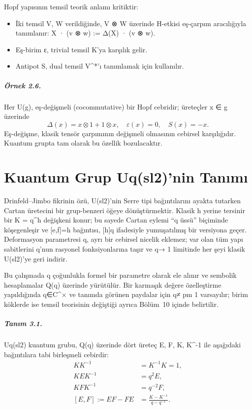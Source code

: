 \documentclass[12pt,a4paper]{report}
\numberwithin{equation}{chapter}
\theoremstyle{plain}
\theoremstyle{definition}
\begin{document}
Hopf yapısının temsil teorik anlamı kritiktir:
\begin{itemize}[leftmargin=*]
  \item İki temsil V, W verildiğinde, V ⊗ W üzerinde H-etkisi
        eş-çarpım aracılığıyla tanımlanır: X · (v ⊗ w) := Δ(X) · (v ⊗ w).
  \item Eş-birim ε, trivial temsil K'ya karşılık gelir.
  \item Antipot S, dual temsil V^*'ı tanımlamak için kullanılır.
\end{itemize}

\paragraph{Örnek 2.6.}
Her U(g), eş-değişmeli (cocommutative) bir Hopf cebridir; üreteçler
x ∈ g üzerinde
\[
  \Delta(x) = x \otimes 1 + 1 \otimes x, \quad \varepsilon(x) = 0, \quad S(x) = -x.
\]
Eş-değişme, klasik tensör çarpımının değişmeli olmasının cebirsel
karşılığıdır. Kuantum grupta tam olarak bu özellik bozulacaktır.


\chapter{Kuantum Grup Uq(sl2)'nin Tanımı}

Drinfeld--Jimbo fikrinin özü, U(sl2)'nin Serre tipi bağıntılarını ayakta
tutarken Cartan üretecini bir grup-benzeri öğeye dönüştürmektir. Klasik
h yerine tersinir bir K = q^h değişkeni konur; bu sayede Cartan eylemi
``q üssü'' biçiminde köşegenleşir ve [e,f]=h bağıntısı, [h]q
ifadesiyle yumuşatılmış bir versiyona geçer. Deformasyon parametresi q, ayrı
bir cebirsel nicelik eklemez; var olan tüm yapı sabitlerini q'nun rasyonel
fonksiyonlarına taşır ve q→ 1 limitinde her şeyi klasik U(sl2)'ye geri
indirir.

Bu çalışmada q çoğunlukla formel bir parametre olarak ele alınır ve sembolik
hesaplamalar Q(q) üzerinde yürütülür. Bir karmaşık değere özelleştirme
yapıldığında q∈C^× ve tanımda görünen paydalar için q≠ pm 1
varsayılır; birim köklerde ise temsil teorisinin değiştiği ayrıca
Bölüm~10 içinde belirtilir.

\paragraph{Tanım 3.1.}\label{def:Uq}
Uq(sl2) kuantum grubu, Q(q) üzerinde dört üreteç E, F, K, K^-1
ile aşağıdaki bağıntılara tabi birleşmeli cebirdir:
\begin{align}
  K K^{-1} &= K^{-1} K = 1, \tag{R1} \\
  K E K^{-1} &= q^{2} E, \tag{R2} \\
  K F K^{-1} &= q^{-2} F, \tag{R3} \\
  [E, F] := EF - FE &= \frac{K - K^{-1}}{q - q^{-1}}. \tag{R4}
\end{align}
\end{document}
